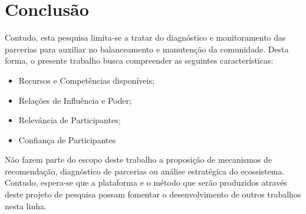 \chapter{Conclusão}\label{cap6}

Contudo, esta pesquisa limita-se a tratar do diagnóstico e monitoramento das parcerias para auxiliar no balanceamento e manutenção da comunidade. Desta forma, o presente trabalho busca compreender as seguintes características: 

\begin{itemize}
	\item Recursos e Competências disponíveis;
	\item Relações de Influência e Poder; 
	\item Relevância de Participantes;
	\item Confiança de Participantes
\end{itemize}

Não fazem parte do escopo deste trabalho a proposição de mecanismos de recomendação, diagnóstico de parcerias ou análise estratégica do ecossistema. Contudo, espera-se que a plataforma e o método que serão produzidos através deste projeto de pesquisa possam fomentar o desenvolvimento de outros trabalhos nesta linha. 


